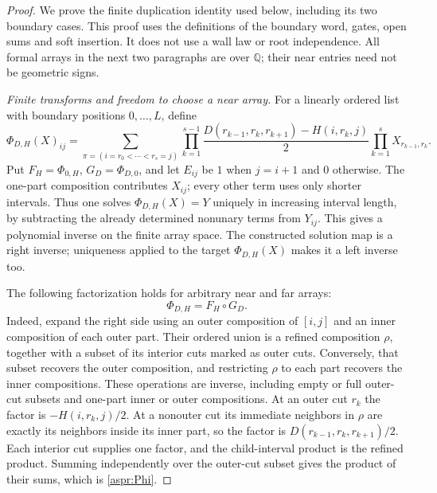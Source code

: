 \begin{proof}\leanok
We prove the finite duplication identity used below, including its two
boundary cases. This proof uses the definitions of the boundary word,
gates, open sums and soft insertion. It does not use a wall law or root
independence. All formal arrays in the next two paragraphs are over
$\mathbb Q$; their near entries need not be geometric signs.

\emph{Finite transforms and freedom to choose a near array.}
For a linearly ordered list with boundary positions $0,\ldots,L$, define
\begin{equation}\label{aspr:Phi}
\Phi_{D,H}(X)_{ij}=
\sum_{\pi=(i=r_0<\cdots<r_s=j)}
\prod_{k=1}^{s-1}
\frac{D(r_{k-1},r_k,r_{k+1})-H(i,r_k,j)}2
\prod_{k=1}^sX_{r_{k-1},r_k}.
\end{equation}
Put $F_H=\Phi_{0,H}$, $G_D=\Phi_{D,0}$, and let $E_{ij}$ be $1$ when
$j=i+1$ and $0$ otherwise. The one-part composition contributes $X_{ij}$;
every other term uses only shorter intervals. Thus one solves
$\Phi_{D,H}(X)=Y$ uniquely in increasing interval length, by subtracting
the already determined nonunary terms from $Y_{ij}$. This gives a
polynomial inverse on the finite array space. The constructed solution
map is a right inverse; uniqueness applied to the target
$\Phi_{D,H}(X)$ makes it a left inverse too.

The following factorization holds for arbitrary near and far arrays:
\begin{equation}\label{aspr:factorization}
\Phi_{D,H}=F_H\circ G_D.
\end{equation}
Indeed, expand the right side using an outer composition of $[i,j]$ and
an inner composition of each outer part. Their ordered union is a refined
composition $\rho$, together with a subset of its interior cuts marked as
outer cuts. Conversely, that subset recovers the outer composition, and
restricting $\rho$ to each part recovers the inner compositions. These
operations are inverse, including empty or full outer-cut subsets and
one-part inner or outer compositions. At an outer cut $r_k$ the factor is
$-H(i,r_k,j)/2$. At a nonouter cut its immediate neighbors in $\rho$
are exactly its neighbors inside its inner part, so the factor is
$D(r_{k-1},r_k,r_{k+1})/2$. Each interior cut supplies one factor, and the
child-interval product is the refined product. Summing independently over
the outer-cut subset gives the product of their sums, which is
\eqref{aspr:Phi}.


\end{proof}
